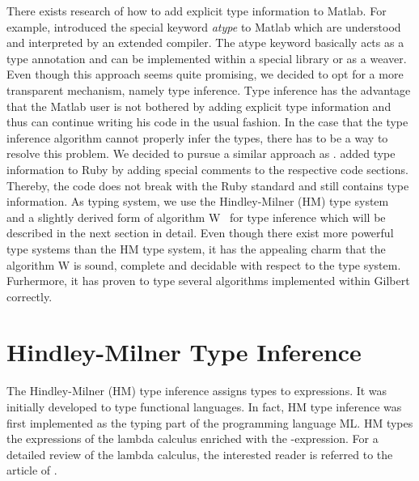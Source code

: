 There exists research of how to add explicit type information to Matlab.
For example, \textcite{hendren:2011a} introduced the special keyword \emph{atype} to Matlab which are understood and interpreted by an extended compiler.
The atype keyword basically acts as a type annotation and can be implemented within a special library or as a weaver.
Even though this approach seems quite promising, we decided to opt for a more transparent mechanism, namely type inference.
Type inference has the advantage that the Matlab user is not bothered by adding explicit type information and thus can continue writing his code in the usual fashion.
In the case that the type inference algorithm cannot properly infer the types, there has to be a way to resolve this problem.
We decided to pursue a similar approach as \textcite{furr:2009a}.
\citeauthor{furr:2009a} added type information to Ruby by adding special comments to the respective code sections.
Thereby, the code does not break with the Ruby standard and still contains type information.
As typing system, we use the Hindley-Milner (HM) type system~\cite{hindley:tams1969a,milner:jcss1978a} and a slightly derived form of algorithm W~\cite{damas:1982a} for type inference which will be described in the next section in detail.
Even though there exist more powerful type systems than the HM type system, it has the appealing charm that the algorithm W is sound, complete and decidable with respect to the type system.
Furhermore, it has proven to type several algorithms implemented within Gilbert correctly.

\section{Hindley-Milner Type Inference}
\label{sec:hmInference}

The Hindley-Milner (HM) type inference assigns types to expressions.
It was initially developed to type functional languages.
In fact, HM type inference was first implemented as the typing part of the programming language ML.
HM types the expressions of the lambda calculus enriched with the -expression.
For a detailed review of the lambda calculus, the interested reader is referred to the article of \textcite{cardone:hhl2006a}.

